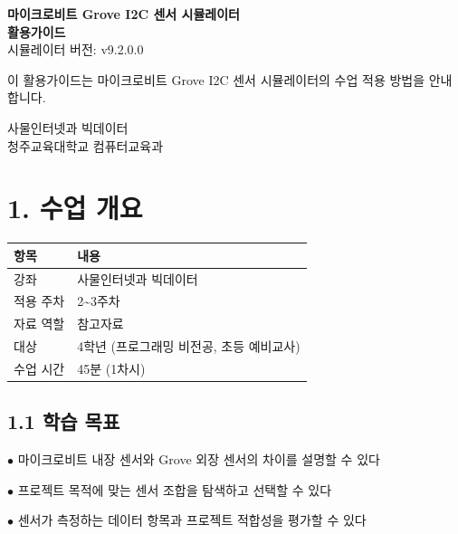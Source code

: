 \documentclass[11pt,a4paper]{article}
\begin{document}
\begin{titlepage}
\centering
\vspace*{3cm}
{\Huge\bfseries\color{primary} 마이크로비트 Grove I2C 센서 시뮬레이터}\\[0.5cm]
{\Huge\bfseries\color{primary} 활용가이드}
\\[1.5cm]
{\Large 시뮬레이터 버전: v9.2.0.0}
\\[2cm]
\begin{tcolorbox}[summarybox]
\centering
{\large 이 활용가이드는 마이크로비트 Grove I2C 센서 시뮬레이터의 수업 적용 방법을 안내합니다.}
\end{tcolorbox}
\vfill
{\large 사물인터넷과 빅데이터}\\[0.3cm]
{\large 청주교육대학교 컴퓨터교육과}
\vspace{1cm}
\end{titlepage}

\section*{1. 수업 개요}

\begin{center}
\renewcommand{\arraystretch}{1.4}
\begin{tabular}{|p{2.8cm}|p{12.2cm}|}
\hline
\rowcolor{tableheader}
\textbf{항목} & \textbf{내용} \\
\hline
강좌 & 사물인터넷과 빅데이터 \\
\hline
적용 주차 & 2\textasciitilde{}3주차 \\
\hline
자료 역할 & 참고자료 \\
\hline
대상 & 4학년 (프로그래밍 비전공, 초등 예비교사) \\
\hline
수업 시간 & 45분 (1차시) \\
\hline
\end{tabular}
\end{center}

\subsection*{1.1 학습 목표}

$\bullet$ 마이크로비트 내장 센서와 Grove 외장 센서의 차이를 설명할 수 있다

$\bullet$ 프로젝트 목적에 맞는 센서 조합을 탐색하고 선택할 수 있다

$\bullet$ 센서가 측정하는 데이터 항목과 프로젝트 적합성을 평가할 수 있다
\end{document}
